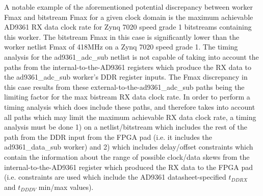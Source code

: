 \documentclass{article}
\begin{document}
\pagebreak
\noindent A notable example of the aforementioned potential discrepancy between worker Fmax and bitstream Fmax for a given clock domain is the maximum achievable AD9361 RX data clock rate for Zynq 7020 speed grade 1 bitstreams containing this worker. The bitstream Fmax in this case is significantly lower than the worker netlist Fmax of 418MHz on a Zynq 7020 speed grade 1. The timing analysis for the ad9361\_adc\_sub netlist is not capable of taking into account the paths from the internal-to-the-AD9361 registers which produce the RX data to the ad9361\_adc\_sub worker's DDR register inputs. The Fmax discrepancy in this case results from these external-to-the-ad9361\_adc\_sub paths being the limiting factor for the max bistream RX data clock rate. In order to perform a timing analysis which does include these paths, and therefore takes into account all paths which may limit the maximum achievable RX data clock rate, a timing analysis must be done 1) on a netlist/bitstream which includes the rest of the path from the DDR input from the FPGA pad (i.e. it includes the ad9361\_data\_sub worker) and 2) which includes delay/offset constraints which contain the information about the range of possible clock/data skews from the internal-to-the-AD9361 register which produced the RX data to the FPGA pad (i.e. constraints are used which include the AD9361 datasheet-specified $t_{DDRX}$ and $t_{DDDV}$ min/max values). \\
\end{document}
